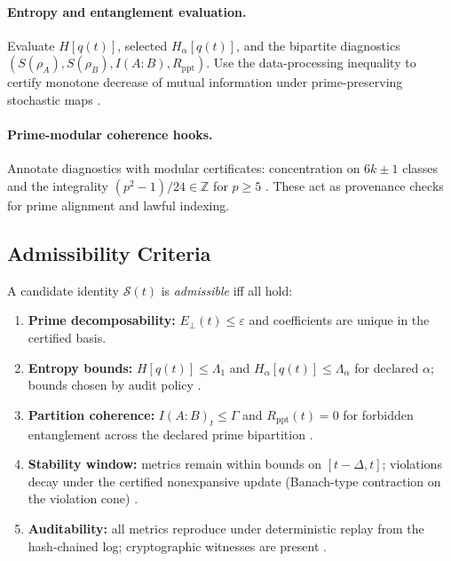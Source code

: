 \documentclass[12pt]{amsart}
\theoremstyle{plain}
\begin{document}
\paragraph{Entropy and entanglement evaluation.}
Evaluate $H[q(t)]$, selected $H_\alpha[q(t)]$, and the bipartite diagnostics $(S(\rho_A),S(\rho_B),I(A{:}B),R_{\mathrm{ppt}})$. Use the data-processing inequality to certify monotone decrease of mutual information under prime-preserving stochastic maps \cite{cover2006elements,nielsen2010quantum}.

\paragraph{Prime-modular coherence hooks.}
Annotate diagnostics with modular certificates: concentration on $6k\pm1$ classes and the integrality $(p^2-1)/24\in\mathbb{Z}$ for $p\ge5$ \cite[Ch.\,5]{hardy2008introduction}. These act as provenance checks for prime alignment and lawful indexing.

\subsection{Admissibility Criteria}

A candidate identity $\mathcal{S}(t)$ is \emph{admissible} iff all hold:
\begin{enumerate}
  \item \textbf{Prime decomposability:} $E_\perp(t)\le\varepsilon$ and coefficients are unique in the certified basis.
  \item \textbf{Entropy bounds:} $H[q(t)]\le \Lambda_1$ and $H_\alpha[q(t)]\le \Lambda_\alpha$ for declared $\alpha$; bounds chosen by audit policy \cite{cover2006elements}.
  \item \textbf{Partition coherence:} $I(A{:}B)_t\le \Gamma$ and $R_{\mathrm{ppt}}(t)=0$ for forbidden entanglement across the declared prime bipartition \cite{peres1996separability,horodecki1996separability}.
  \item \textbf{Stability window:} metrics remain within bounds on $[t-\Delta,t]$; violations decay under the certified nonexpansive update (Banach-type contraction on the violation cone) \cite{granas2003fixed}.
  \item \textbf{Auditability:} all metrics reproduce under deterministic replay from the hash-chained log; cryptographic witnesses are present \cite{merkle1989certified,goldreich2001foundations}.
\end{enumerate}
\end{document}
